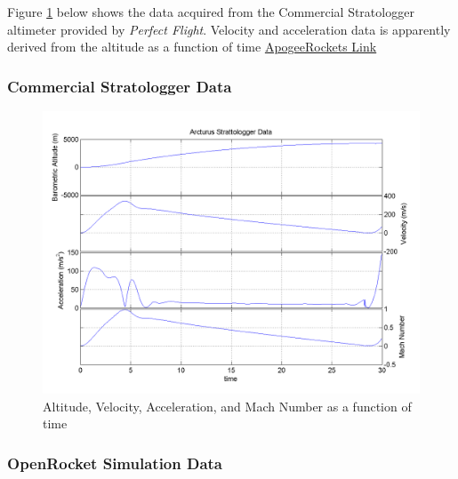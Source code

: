 \documentclass[]{article}
\begin{document}
\clearpage

Figure \ref{arcturus_strattologger_plot_label} below shows the data
acquired from the Commercial Stratologger altimeter provided by
\emph{Perfect Flight}. Velocity and acceleration data is apparently
derived from the altitude as a function of time
\href{https://www.apogeerockets.com/Electronics_Payloads/Altimeters/PerfectFlite_StratoLogger_Altimeter}{ApogeeRockets
Link}

\subsubsection{Commercial Stratologger
Data}\label{commercial-stratologger-data}

\begin{figure}[htbp]
\centering
\includegraphics{images/plots/arcturus_strattologger_plot.png}
\caption{Altitude, Velocity, Acceleration, and Mach Number as a function
of time \label{arcturus_strattologger_plot_label}}
\end{figure}

\clearpage

\subsubsection{OpenRocket Simulation
Data}\label{openrocket-simulation-data}
\end{document}
